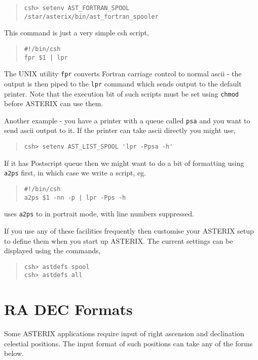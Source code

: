\documentclass{book}
\renewcommand{\_}{{\tt\char'137}}     %
\begin{document}
\begin{quote}\begin{verbatim}
csh> setenv AST_FORTRAN_SPOOL /star/asterix/bin/ast_fortran_spooler
\end{verbatim}\end{quote}
This command is just a very simple csh script,
 
\begin{quote}\begin{verbatim}
#!/bin/csh
fpr $1 | lpr
\end{verbatim}\end{quote}
The UNIX utility {\tt fpr} converts Fortran carriage control to normal
ascii - the output is then piped to the {\tt lpr} command which sends
output to the default printer. Note that the execution bit of such
scripts must be set using {\tt chmod} before ASTERIX can use them.
 
Another example - you have a printer with a queue
called {\tt psa} and you want to send ascii output to it. If the printer
can take ascii directly you might use,
 
\begin{quote}\begin{verbatim}
csh> setenv AST_LIST_SPOOL 'lpr -Ppsa -h'
\end{verbatim}\end{quote}
If it has Postscript queue then we might want to do a bit of
formatting using {\tt a2ps} first, in which case we write a script, eg.
 
\begin{quote}\begin{verbatim}
#!/bin/csh
a2ps $1 -nn -p | lpr -Pps -h
\end{verbatim}\end{quote}
uses {\tt a2ps} to in portrait mode, with line numbers suppressed.
 
If you use any of these facilities frequently then customise
your ASTERIX setup to define them when you start up ASTERIX. The
current settings can be displayed using the commands,
 
\begin{quote}\begin{verbatim}
csh> astdefs spool
csh> astdefs all
\end{verbatim}\end{quote}
\section{RA DEC Formats}
Some ASTERIX applications require input of right ascension and
declination celestial positions. The input format of such positions
can take any of the forms below.
 
\end{document}
